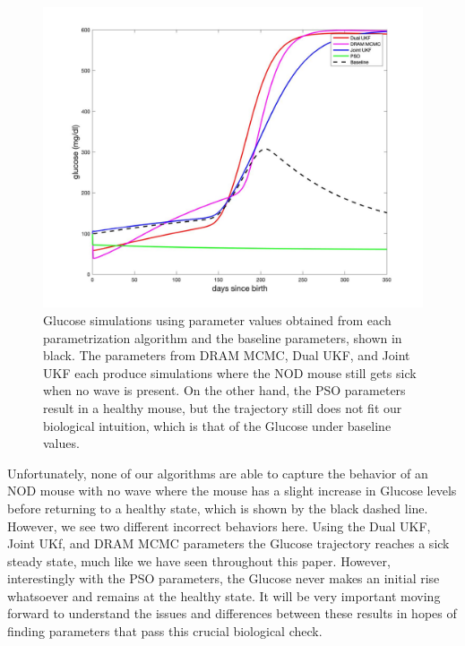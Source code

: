 \begin{figure}[H] 
    \centering
    \includegraphics[width=15cm]{Kalman_Filter_Images/NoWave_Glucose_Comparisons.jpg}
    \caption{Glucose simulations using parameter values obtained from each parametrization algorithm and the baseline parameters, shown in black. The parameters from DRAM MCMC, Dual UKF, and Joint UKF each produce simulations where the NOD mouse still gets sick when no wave is present. On the other hand, the PSO parameters result in a healthy mouse, but the trajectory still does not fit our biological intuition, which is that of the Glucose under baseline values.}
    \label{fig:T1D_GlucoseAllAlgos_NoWave}
\end{figure}

Unfortunately, none of our algorithms are able to capture the behavior of an NOD mouse with no wave where the mouse has a slight increase in Glucose levels before returning to a healthy state, which is shown by the black dashed line. However, we see two different incorrect behaviors here. Using the Dual UKF, Joint UKf, and DRAM MCMC parameters the Glucose trajectory reaches a sick steady state, much like we have seen throughout this paper. However, interestingly with the PSO parameters, the Glucose never makes an initial rise whatsoever and remains at the healthy state. It will be very important moving forward to understand the issues and differences between these results in hopes of finding parameters that pass this crucial biological check.